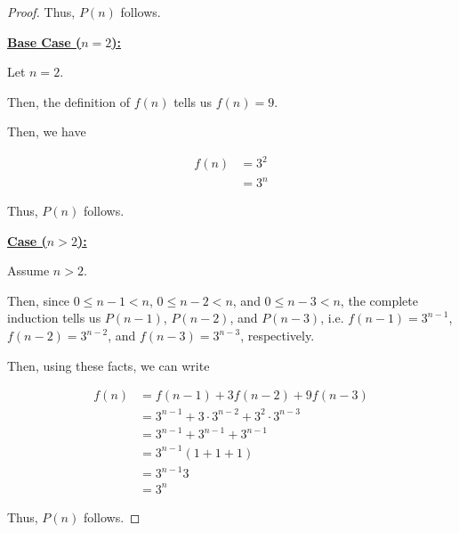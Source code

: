 \documentclass[12pt]{article}
\begin{document}
\begin{itemize}
\begin{proof}
    Thus, $P(n)$ follows.

    \bigskip

    \underline{\textbf{Base Case ($n = 2$):}}

    \bigskip

    Let $n = 2$.

    \bigskip

    Then, the definition of $f(n)$ tells us $f(n) = 9$.

    \bigskip

    Then, we have

    \begin{align}
        f(n) &= 3^2\\
        &= 3^n
    \end{align}

    \bigskip

    Thus, $P(n)$ follows.

    \bigskip

    \underline{\textbf{Case ($n > 2$):}}

    \bigskip

    Assume $n > 2$.

    \bigskip

    Then, since $0 \leq n - 1 < n$, $0 \leq n -2 < n$, and $0 \leq n - 3 < n$,
    the complete induction tells us $P(n-1)$, $P(n-2)$, and $P(n-3)$, i.e.
    $f(n-1) = 3^{n-1}$, $f(n-2) = 3^{n-2}$, and $f(n-3) = 3^{n-3}$, respectively.

    \bigskip

    Then, using these facts, we can write

    \begin{align}
        f(n) &= f(n-1) + 3f(n-2) + 9f(n-3)\\
        &= 3^{n-1} + 3 \cdot 3^{n-2} + 3^2 \cdot 3^{n-3}\\
        &= 3^{n-1} + 3^{n-1} + 3^{n-1}\\
        &= 3^{n-1}(1 + 1 + 1)\\
        &= 3^{n-1}3\\
        &= 3^n
    \end{align}

    \bigskip

    Thus, $P(n)$ follows.
    \end{proof}
\end{itemize}


\end{document}
